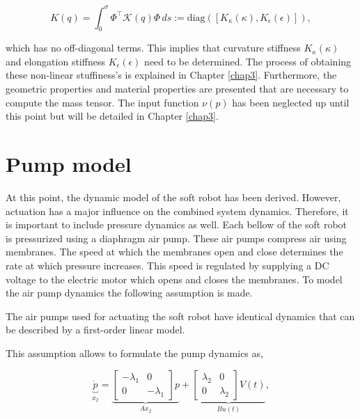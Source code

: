 \begin{equation}
    K(q) = \int_0^\sigma \Phi^\top \mathcal{K}(q) \Phi \hspace{2pt} ds := \text{diag}([K_\kappa(\kappa), K_\epsilon(\epsilon)]),
\end{equation}

which has no off-diagonal terms. This implies that curvature stiffness $K_\kappa(\kappa)$ and elongation stiffness $K_\epsilon(\epsilon)$ need to be determined. The process of obtaining these non-linear stuffiness's is explained in Chapter \ref{chap3}. Furthermore, the geometric properties and material properties are presented that are necessary to compute the mass tensor. The input function $\nu(p)$ has been neglected up until this point but will be detailed in Chapter \ref{chap3}. 




\section{Pump model}


At this point, the dynamic model of the soft robot has been derived. However, actuation has a major influence on the combined system dynamics. Therefore, it is important to include pressure dynamics as well. Each bellow of the soft robot is pressurized using a diaphragm air pump. These air pumps compress air using membranes. The speed at which the membranes open and close determines the rate at which pressure increases. This speed is regulated by supplying a DC voltage to the electric motor which opens and closes the membranes. To model the air pump dynamics the following assumption is made.

\begin{theorem}
The air pumps used for actuating the soft robot have identical dynamics that can be described by a first-order linear model.
\end{theorem}

This assumption allows to formulate the pump dynamics as,

\begin{equation}
 \underbrace{\dot{p}}_{\dot{x_2}}  = \underbrace{\begin{bmatrix} -\lambda_1 & 0 \\ 0 & -\lambda_1 \end{bmatrix} p}_{Ax_2} + \underbrace{\begin{bmatrix} \lambda_2 & 0 \\ 0 & \lambda_2 \end{bmatrix} V(t)}_{Bu(t)},
    \label{eq2:pumpmodel}
\end{equation}

